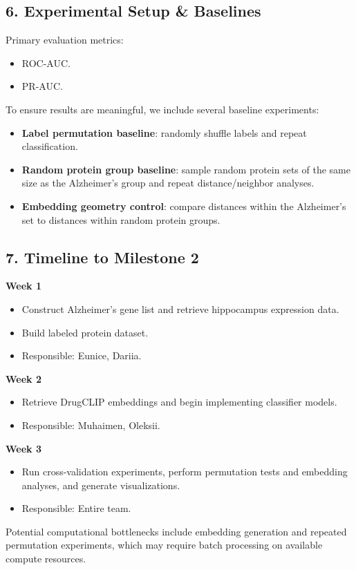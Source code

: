 \documentclass{article}
\begin{document}
\subsection*{6. Experimental Setup \& Baselines}
Primary evaluation metrics:
\begin{itemize}
    \item ROC-AUC.
    \item PR-AUC.
\end{itemize}

To ensure results are meaningful, we include several baseline experiments:
\begin{itemize}
    \item \textbf{Label permutation baseline}: randomly shuffle labels and repeat classification.
    \item \textbf{Random protein group baseline}: sample random protein sets of the same size as the Alzheimer's group and repeat distance/neighbor analyses.
    \item \textbf{Embedding geometry control}: compare distances within the Alzheimer's set to distances within random protein groups.
\end{itemize}

\subsection*{7. Timeline to Milestone 2}
\textbf{Week 1}
\begin{itemize}
    \item Construct Alzheimer's gene list and retrieve hippocampus expression data.
    \item Build labeled protein dataset.
    \item Responsible: Eunice, Dariia.
\end{itemize}

\textbf{Week 2}
\begin{itemize}
    \item Retrieve DrugCLIP embeddings and begin implementing classifier models.
    \item Responsible: Muhaimen, Oleksii.
\end{itemize}

\textbf{Week 3}
\begin{itemize}
    \item Run cross-validation experiments, perform permutation tests and embedding analyses, and generate visualizations.
    \item Responsible: Entire team.
\end{itemize}

Potential computational bottlenecks include embedding generation and repeated permutation experiments, which may require batch processing on available compute resources.



\end{document}

